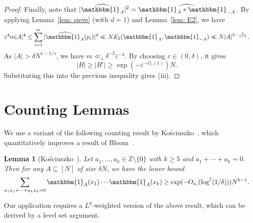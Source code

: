 \documentclass[A4paper,reqno,oneside,12pt]{amsart}
\theoremstyle{plain}
\newtheorem{lemma}[theorem]{Lemma}
\theoremstyle{definition}
\newcommand{\e}{\mathbbm{1}}          %
\newcommand{\Z}{\mathbb{Z}}
\begin{document}
\begin{proof}
Finally, note that $|\widehat{\e_A}|^2=\widehat{\e_A*\e_{-A}}$. By applying Lemma~\ref{lem: sieve} (with $d=1$) and Lemma~\ref{lem: E2}, we have
\[
    \varepsilon^4 m |A|^4\leq \sum_{i=1}^m |\widehat{\e_A}(p_i)|^4\ll N E_2(\e_A,\e_{-A})\ll N|A|^{3-\frac{1}{s-1}}.
\]
As $|A|>\delta N^{1-1/s}$, we have $m\ll_{s} \delta^{-2}\varepsilon^{-4}$. By choosing $\varepsilon\in(0,\delta)$, it gives  
\[
|B|\geq |B'|\geq \exp(-\varepsilon^{-O_s(1)})N. 
\]
Substituting this into the previous inequality gives (iii).
\end{proof}

\section{Counting Lemmas}\label{sec:counting}

We use a variant of the following counting result by Ko\'sciuszko~\cite{K25}, which quantitatively improves a result of Bloom~\cite{Bloom}.

\begin{lemma}[Ko\'sciuszko~\cite{K25}]\label{Kosciuszko counting}
Let $a_1,\dots,a_k \in \Z\setminus \{0\}$ with $k\ge 5$ and $a_1 +\cdots +a_k = 0$. Then for any $A \subseteq [N]$ of size $\delta N$, we have the lower bound
\[
\sum_{a_1x_1+\cdots +a_kx_k = 0}  \e_A(x_1)\cdots \e_A(x_k)
\ge \exp(-O_{a_i} ( \log^7(1/\delta)))N^{k-1}.
\]
\end{lemma}

Our application requires a $L^p$-weighted version of the above result, which can be derived by a level set argument. 
\end{document}
